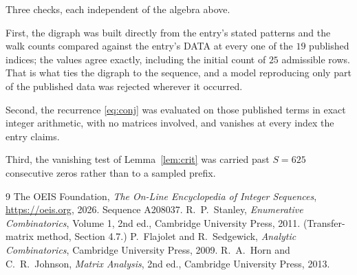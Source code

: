 \documentclass[11pt,a4paper]{article}
\theoremstyle{plain}
\theoremstyle{definition}
\begin{document}
Three checks, each independent of the algebra above.

First, the digraph was built directly from the entry's stated patterns and the walk counts
compared against the entry's DATA at every one of the $19$ published indices; the
values agree exactly, including the initial count of $25$ admissible rows. That is
what ties the digraph to the sequence, and a model reproducing only part of the published
data was rejected wherever it occurred.

Second, the recurrence \eqref{eq:conj} was evaluated on those published terms in exact
integer arithmetic, with no matrices involved, and vanishes at every index the entry claims.

Third, the vanishing test of Lemma~\ref{lem:crit} was carried past $S=625$ consecutive
zeros rather than to a sampled prefix.

\begin{thebibliography}{9}
 The OEIS Foundation, \emph{The On-Line Encyclopedia of Integer
Sequences}, \url{https://oeis.org}, 2026. Sequence A208037.
 R.~P.~Stanley, \emph{Enumerative Combinatorics}, Volume 1, 2nd ed.,
Cambridge University Press, 2011. (Transfer-matrix method, Section 4.7.)
 P.~Flajolet and R.~Sedgewick, \emph{Analytic Combinatorics}, Cambridge
University Press, 2009.
 R.~A.~Horn and C.~R.~Johnson, \emph{Matrix Analysis}, 2nd ed., Cambridge
University Press, 2013.
\end{thebibliography}
\end{document}
